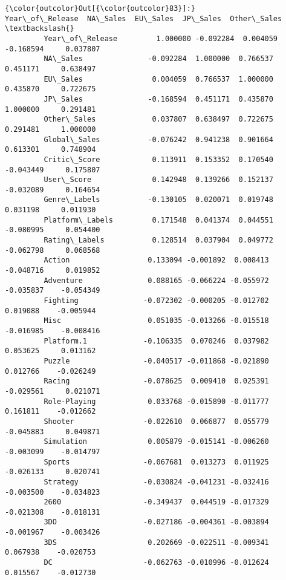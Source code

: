 \documentclass[11pt]{article}
\begin{document}
\begin{Verbatim}[commandchars=\\\{\}]
{\color{outcolor}Out[{\color{outcolor}83}]:}                  Year\_of\_Release  NA\_Sales  EU\_Sales  JP\_Sales  Other\_Sales  \textbackslash{}
         Year\_of\_Release         1.000000 -0.092284  0.004059 -0.168594     0.037807   
         NA\_Sales               -0.092284  1.000000  0.766537  0.451171     0.638497   
         EU\_Sales                0.004059  0.766537  1.000000  0.435870     0.722675   
         JP\_Sales               -0.168594  0.451171  0.435870  1.000000     0.291481   
         Other\_Sales             0.037807  0.638497  0.722675  0.291481     1.000000   
         Global\_Sales           -0.076242  0.941238  0.901664  0.613301     0.748904   
         Critic\_Score            0.113911  0.153352  0.170540 -0.043449     0.175807   
         User\_Score              0.142948  0.139266  0.152137 -0.032089     0.164654   
         Genre\_Labels           -0.130105  0.020071  0.019748  0.031198     0.011930   
         Platform\_Labels         0.171548  0.041374  0.044551 -0.080995     0.054400   
         Rating\_Labels           0.128514  0.037904  0.049772 -0.062798     0.068568   
         Action                  0.133094 -0.001892  0.008413 -0.048716     0.019852   
         Adventure               0.088165 -0.066224 -0.055972 -0.035837    -0.054349   
         Fighting               -0.072302 -0.000205 -0.012702  0.019088    -0.005944   
         Misc                    0.051035 -0.013266 -0.015518 -0.016985    -0.008416   
         Platform.1             -0.106335  0.070246  0.037982  0.053625     0.013162   
         Puzzle                 -0.040517 -0.011868 -0.021890  0.012766    -0.026249   
         Racing                 -0.078625  0.009410  0.025391 -0.029561     0.021071   
         Role-Playing            0.033768 -0.015890 -0.011777  0.161811    -0.012662   
         Shooter                -0.022610  0.066877  0.055779 -0.045883     0.049871   
         Simulation              0.005879 -0.015141 -0.006260 -0.003099    -0.014797   
         Sports                 -0.067681  0.013273  0.011925 -0.026133     0.020741   
         Strategy               -0.030824 -0.041231 -0.032416 -0.003500    -0.034823   
         2600                   -0.349437  0.044519 -0.017329 -0.021308    -0.018131   
         3DO                    -0.027186 -0.004361 -0.003894 -0.001967    -0.003426   
         3DS                     0.202669 -0.022511 -0.009341  0.067938    -0.020753   
         DC                     -0.062763 -0.010996 -0.012624  0.015567    -0.012730   

\end{Verbatim}
\end{document}
